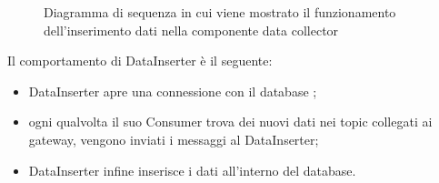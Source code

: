 \begin{landscape}
\begin{figure}[H]
				\caption{Diagramma di sequenza in cui viene mostrato il funzionamento dell'inserimento dati nella componente data collector}
				\label{Diagramma 8}
			\end{figure}
			Il comportamento di DataInserter è il seguente:
			\begin{itemize}
				\item DataInserter apre una connessione con il database ;
				\item ogni qualvolta il suo Consumer trova dei nuovi dati nei topic collegati ai gateway, vengono inviati i messaggi al DataInserter;
				\item DataInserter infine inserisce i dati all'interno del database.
			\end{itemize}
	\end{landscape}